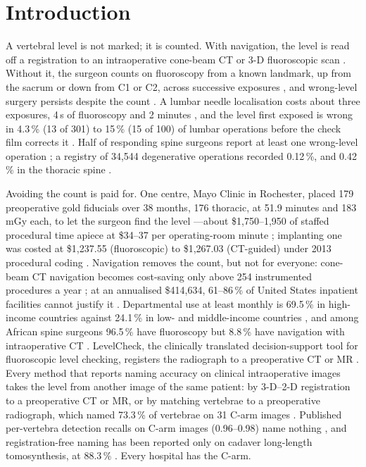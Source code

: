 \documentclass[11pt,letterpaper]{article}
\begin{document}
\clearpage
\section*{Introduction}
A vertebral level is not marked; it is counted. With navigation, the level is read off a registration to an intraoperative cone-beam CT or 3-D fluoroscopic scan \citep{strong2021}. Without it, the surgeon counts on fluoroscopy from a known landmark, up from the sacrum or down from C1 or C2, across successive exposures \citep{manbachi2018,strong2021}, and wrong-level surgery persists despite the count \citep{hsiang2011}. A lumbar needle localisation costs about three exposures, 4\,s of fluoroscopy and 2 minutes \citep{prodhomme2021}, and the level first exposed is wrong in 4.3\,\% (13 of 301) to 15\,\% (15 of 100) of lumbar operations before the check film corrects it \citep{dablouk2019,ammerman2006}. Half of responding spine surgeons report at least one wrong-level operation \citep{mody2008,groff2013}; a registry of 34,544 degenerative operations recorded 0.12\,\%, and 0.42\,\% in the thoracic spine \citep{furuya2026}.

Avoiding the count is paid for. One centre, Mayo Clinic in Rochester, placed 179 preoperative gold fiducials over 38 months, 176 thoracic, at 51.9 minutes and 183\,mGy each, to let the surgeon find the level \citep{siminski2023}---about \$1,750--1,950 of staffed procedural time apiece at \$34--37 per operating-room minute \citep{childers2018}; implanting one was costed at \$1,237.55 (fluoroscopic) to \$1,267.03 (CT-guided) under 2013 procedural coding \citep{macki2014}. Navigation removes the count, but not for everyone: cone-beam CT navigation becomes cost-saving only above 254 instrumented procedures a year \citep{dea2016}; at an annualised \$414,634, 61--86\,\% of United States inpatient facilities cannot justify it \citep{suri2023}. Departmental use at least monthly is 69.5\,\% in high-income countries against 24.1\,\% in low- and middle-income countries \citep{motov2025}, and among African spine surgeons 96.5\,\% have fluoroscopy but 8.8\,\% have navigation with intraoperative CT \citep{kanmounye2021}. LevelCheck, the clinically translated decision-support tool for fluoroscopic level checking, registers the radiograph to a preoperative CT or MR \citep{otake2012fail,levelcheck2012,manbachi2018}. Every method that reports naming accuracy on clinical intraoperative images takes the level from another image of the same patient: by 3-D--2-D registration to a preoperative CT or MR, or by matching vertebrae to a preoperative radiograph, which named 73.3\,\% of vertebrae on 31 C-arm images \citep{zhang2023vdvm}. Published per-vertebra detection recalls on C-arm images (0.96--0.98) name nothing \citep{rao2024}, and registration-free naming has been reported only on cadaver long-length tomosynthesis, at 88.3\,\% \citep{huang2022}. Every hospital has the C-arm.
\end{document}
